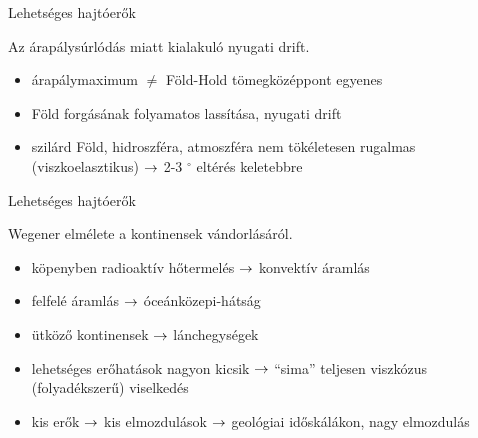 \documentclass{beamer}
\begin{document}
\begin{frame}{Lehetséges hajtóerők}
    \begin{center}
    \begin{minipage}[c]{0.7\textwidth}
        \centering
        
        Az árapálysúrlódás miatt kialakuló nyugati drift.
    \end{minipage}
    \end{center}
    
    \begin{minipage}[c]{0.45\textwidth}
        \begin{itemize}
            \item árapálymaximum $\ne$ Föld-Hold tömegközéppont egyenes
            \item Föld forgásának folyamatos lassítása, nyugati drift
        \end{itemize}
    \end{minipage}
    \begin{minipage}[c]{0.45\textwidth}
        \begin{itemize}
            \item szilárd Föld, hidroszféra, atmoszféra nem tökéletesen rugalmas (viszkoelasztikus) $\rightarrow$ 2-3 $^\circ$ eltérés keletebbre
        \end{itemize}
    \end{minipage}
\end{frame}


\begin{frame}{Lehetséges hajtóerők}
    \begin{minipage}[c]{0.45\textwidth}
        \centering
        
        Wegener elmélete a kontinensek vándorlásáról.
    \end{minipage}
    \hspace{5pt}
    \begin{minipage}[c]{0.4\textwidth}
        \begin{itemize}
            \item köpenyben radioaktív hőtermelés $\rightarrow$ konvektív áramlás
            \item felfelé áramlás $\rightarrow$ óceánközepi-hátság
            \item ütköző kontinensek $\rightarrow$ lánchegységek
            \item lehetséges erőhatások nagyon kicsik $\rightarrow$ ``sima'' teljesen viszkózus (folyadékszerű) viselkedés
            \item kis erők $\rightarrow$ kis elmozdulások $\rightarrow$ geológiai időskálákon, nagy elmozdulás
        \end{itemize}
    \end{minipage}
\end{frame}
\end{document}
